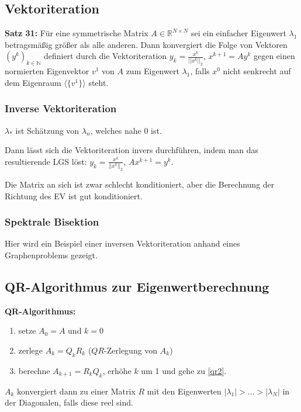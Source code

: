 \documentclass[a4paper]{article}
\newcommand{\set}[1]{\{ #1 \}}
\begin{document}
\subsection{Vektoriteration}

\textbf{Satz 31:} Für eine symmetrische Matrix $A \in \mathbb{R}^{N \times N}$
sei ein einfacher Eigenwert $\lambda_1$ betragsmäßig größer als alle anderen.
Dann konvergiert die Folge von Vektoren $(y^k)_{k \in \mathbb{N}}$ definiert
durch die Vektoriteration $y_k = \frac{x^k}{||x^k||_2}$, $x^{k + 1} = A y^k$
gegen einen normierten Eigenvektor $v^1$ von $A$ zum Eigenwert $\lambda_1$,
falls $x^0$ nicht senkrecht auf dem Eigenraum $\langle\set{v^1}\rangle$ steht.

\subsubsection{Inverse Vektoriteration}

$\lambda_*$ ist Schätzung von $\lambda_n$, welches nahe 0 ist.

Dann lässt sich die Vektoriteration invers durchführen, indem man das
resultierende LGS löst: $y_k = \frac{x^k}{||x^k||_2}$, $A x^{k + 1} = y^k$.

Die Matrix an sich ist zwar schlecht konditioniert, aber die Berechnung der
Richtung des EV ist gut konditioniert.

\subsubsection{Spektrale Bisektion}

Hier wird ein Beispiel einer inversen Vektoriteration anhand eines
Graphenproblems gezeigt.

\subsection{QR-Algorithmus zur Eigenwertberechnung}

\textbf{QR-Algorithmus:}
\begin{enumerate}
    \item setze $A_0 = A$ und $k = 0$
    \item\label{qr2} zerlege $A_k = Q_k R_k$ ($QR$-Zerlegung von $A_k$)
    \item berechne $A_{k + 1} = R_k Q_k$, erhöhe $k$ um 1 und gehe zu \ref{qr2}.
\end{enumerate}

$A_k$ konvergiert dann zu einer Matrix $R$ mit den Eigenwerten $|\lambda_1| >
\dots > |\lambda_N|$ in der Diagonalen, falls diese reel sind.
\end{document}
